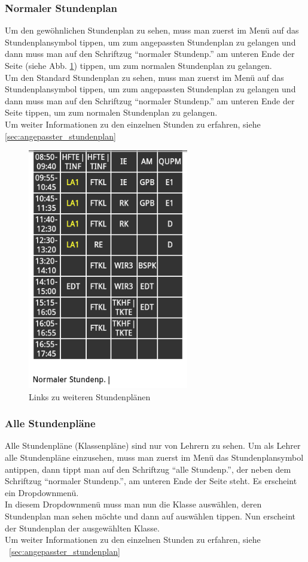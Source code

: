 \subsubsection{Normaler Stundenplan}
Um den gewöhnlichen Stundenplan zu sehen, muss man zuerst im Menü auf das Stundenplansymbol tippen, um zum angepassten Stundenplan zu gelangen und dann muss man auf den Schriftzug \enquote{normaler Stundenp.} am unteren Ende der Seite (siehe Abb. \ref{fig:App_Timetable_Bottom}) tippen, um zum normalen Stundenplan zu gelangen.\\
Um den Standard Stundenplan zu sehen, muss man zuerst im Menü auf das Stundenplansymbol tippen, um zum angepassten Stundenplan zu gelangen und dann muss man auf den Schriftzug \enquote{normaler Stundenp.} am unteren Ende der Seite tippen, um zum normalen Stundenplan zu gelangen.\\
Um weiter Informationen zu den einzelnen Stunden zu erfahren, siehe \ref{sec:angepasster_stundenplan}

\begin{figure}[H]
\centering
\includegraphics[keepaspectratio=true, width=7cm]{images/app_instructions/appTimetBottom.png}
\caption{Links zu weiteren Stundenplänen}
\label{fig:App_Timetable_Bottom}
\end{figure}

\subsubsection{Alle Stundenpläne}
Alle Stundenpläne (Klassenpläne) sind nur von Lehrern zu sehen. Um als Lehrer alle Stundenpläne einzusehen, muss man zuerst im Menü das Stundenplansymbol antippen, dann tippt man auf den Schriftzug \enquote{alle Stundenp.}, der neben dem Schriftzug \enquote{normaler Stundenp.}, am unteren Ende der Seite steht. Es erscheint ein Dropdownmenü.\\
In diesem Dropdownmenü muss man nun die Klasse auswählen, deren Stundenplan man sehen möchte und dann auf auswählen tippen. Nun erscheint der Stundenplan der ausgewählten Klasse.\\
Um weiter Informationen zu den einzelnen Stunden zu erfahren, siehe ~\ref{sec:angepasster_stundenplan}

